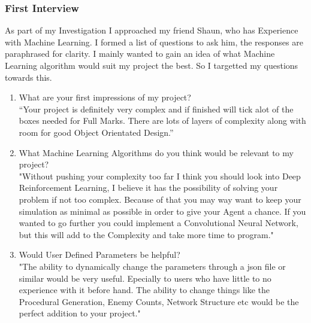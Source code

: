 \begin{flushleft}
            \subsubsection{First Interview}
                \large
                \vspace{0.2cm}
                As part of my Investigation I approached my friend Shaun, who has Experience with Machine Learning.
                I formed a list of questions to ask him, the responses are paraphrased for clarity. I mainly wanted to gain an idea of 
                what Machine Learning algorithm would suit my project the best. So I targetted my questions towards this. \\
                \vspace{0.2cm}
                \begin{enumerate}
                    \item {\large What are your first impressions of my project?} \\
                    \vspace{0.2cm}
                    “Your project is definitely very complex and if finished will tick alot of the boxes needed for Full Marks. There are lots
                    of layers of complexity along with room for good Object Orientated Design.”

                    \vspace{0.5cm}
                    \item {\large What Machine Learning Algorithms do you think would be relevant to my project?} \\
                    \vspace{0.2cm}
                    "Without pushing your complexity too far I think you should look into Deep Reinforcement Learning, I believe it has the
                    possibility of solving your problem if not too complex. Because of that you may way want to keep your simulation as minimal
                    as possible in order to give your Agent a chance. If you wanted to go further you could implement a Convolutional Neural Network, 
                    but this will add to the Complexity and take more time to program."

                    \vspace{0.5cm}
                    \item {\large Would User Defined Parameters be helpful?} \\
                    \vspace{0.2cm}
                    "The ability to dynamically change the parameters through a json file or similar would be very useful. Epecially to users who
                    have little to no experience with it before hand. The ability to change things like the Procedural Generation, Enemy Counts, 
                    Network Structure etc would be the perfect addition to your project."


\end{enumerate}
\end{flushleft}
